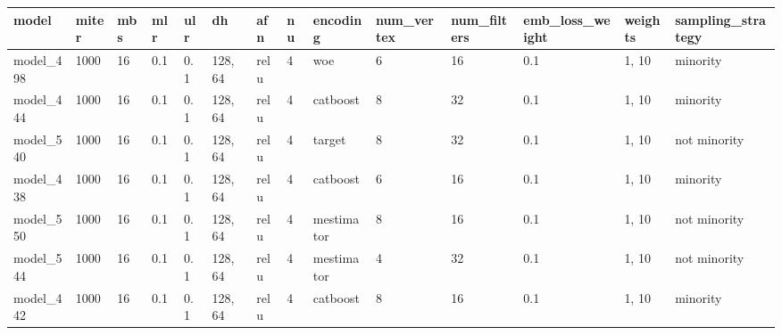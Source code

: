 \begin{tabular}{|l|l|l|l|l|l|l|l|l|l|l|l|l|l|}
\hline
\textbf{model} & \textbf{miter} & \textbf{mbs} & \textbf{mlr} & \textbf{ulr} & \textbf{dh} & \textbf{afn} & \textbf{nu} & \textbf{encoding} & \textbf{num\_vertex} & \textbf{num\_filters} & \textbf{emb\_loss\_weight} & \textbf{weights} & \textbf{sampling\_strategy} \\ \hline
model\_498     & 1000           & 16           & 0.1          & 0.1          & 128, 64     & relu         & 4           & woe               & 6                    & 16                    & 0.1                        & 1, 10            & minority                    \\ \hline
model\_444     & 1000           & 16           & 0.1          & 0.1          & 128, 64     & relu         & 4           & catboost          & 8                    & 32                    & 0.1                        & 1, 10            & minority                    \\ \hline
model\_540     & 1000           & 16           & 0.1          & 0.1          & 128, 64     & relu         & 4           & target            & 8                    & 32                    & 0.1                        & 1, 10            & not minority                \\ \hline
model\_438     & 1000           & 16           & 0.1          & 0.1          & 128, 64     & relu         & 4           & catboost          & 6                    & 16                    & 0.1                        & 1, 10            & minority                    \\ \hline
model\_550     & 1000           & 16           & 0.1          & 0.1          & 128, 64     & relu         & 4           & mestimator        & 8                    & 16                    & 0.1                        & 1, 10            & not minority                \\ \hline
model\_544     & 1000           & 16           & 0.1          & 0.1          & 128, 64     & relu         & 4           & mestimator        & 4                    & 32                    & 0.1                        & 1, 10            & not minority                \\ \hline
model\_442     & 1000           & 16           & 0.1          & 0.1          & 128, 64     & relu         & 4           & catboost          & 8                    & 16                    & 0.1                        & 1, 10            & minority                    \\ \hline

\end{tabular}
